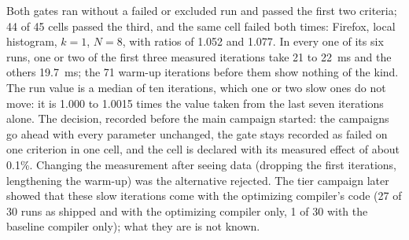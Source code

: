 Both gates ran without a failed or excluded run and passed the first two
criteria; 44 of 45 cells passed the third, and the same cell failed both
times: Firefox, local histogram, $k=1$, $N=8$, with ratios of 1.052 and
1.077. In every one of its six runs, one or two of the first three measured
iterations take 21 to 22~ms and the others 19.7~ms; the 71 warm-up
iterations before them show nothing of the kind. The run value is a median
of ten iterations, which one or two slow ones do not move: it is 1.000 to
1.0015 times the value taken from the last seven iterations alone. The
decision, recorded before the main campaign started: the campaigns go ahead
with every parameter unchanged, the gate stays recorded as failed on one
criterion in one cell, and the cell is declared with its measured effect of
about 0.1\%. Changing the measurement after seeing data (dropping the first
iterations, lengthening the warm-up) was the alternative rejected. The tier
campaign later showed that these slow iterations come with the optimizing
compiler's code (27 of 30 runs as shipped and with the optimizing compiler
only, 1 of 30 with the baseline compiler only); what they are is not known.

